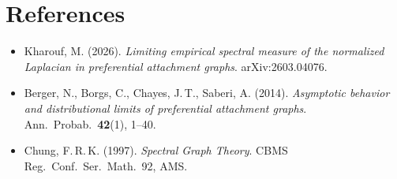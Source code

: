 \documentclass[11pt,a4paper]{article}
\begin{document}
\section*{References}
\begin{itemize}[leftmargin=*,label={},itemsep=2pt]
  \item Kharouf, M. (2026). \emph{Limiting empirical spectral measure of the normalized Laplacian in preferential attachment graphs}. arXiv:2603.04076.
  \item Berger, N., Borgs, C., Chayes, J.\,T., Saberi, A. (2014). \emph{Asymptotic behavior and distributional limits of preferential attachment graphs}. Ann.\ Probab.\ \textbf{42}(1), 1--40.
  \item Chung, F.\,R.\,K. (1997). \emph{Spectral Graph Theory}. CBMS Reg.\ Conf.\ Ser.\ Math.\ 92, AMS.
\end{itemize}
\end{document}
